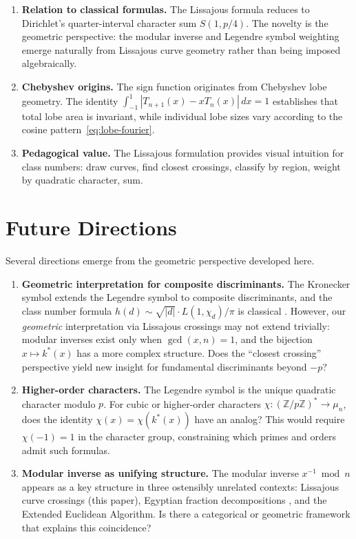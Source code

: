 \documentclass[11pt,a4paper]{article}
\begin{document}
\begin{enumerate}
\item \textbf{Relation to classical formulas.} The Lissajous formula reduces to Dirichlet's quarter-interval character sum $S(1, p/4)$. The novelty is the geometric perspective: the modular inverse and Legendre symbol weighting emerge naturally from Lissajous curve geometry rather than being imposed algebraically.

\item \textbf{Chebyshev origins.} The sign function originates from Chebyshev lobe geometry. The identity $\int_{-1}^{1} |T_{n+1}(x) - x T_n(x)| \, dx = 1$ \cite{Popelka2025integral} establishes that total lobe area is invariant, while individual lobe sizes vary according to the cosine pattern~\eqref{eq:lobe-fourier}.

\item \textbf{Pedagogical value.} The Lissajous formulation provides visual intuition for class numbers: draw curves, find closest crossings, classify by region, weight by quadratic character, sum.
\end{enumerate}

\section{Future Directions}

Several directions emerge from the geometric perspective developed here.

\begin{enumerate}
\item \textbf{Geometric interpretation for composite discriminants.} The Kronecker symbol extends the Legendre symbol to composite discriminants, and the class number formula $h(d) \sim \sqrt{|d|} \cdot L(1, \chi_d) / \pi$ is classical \cite{IrelandRosen}. However, our \emph{geometric} interpretation via Lissajous crossings may not extend trivially: modular inverses exist only when $\gcd(x, n) = 1$, and the bijection $x \mapsto k^*(x)$ has a more complex structure. Does the ``closest crossing'' perspective yield new insight for fundamental discriminants beyond $-p$?

\item \textbf{Higher-order characters.} The Legendre symbol is the unique quadratic character modulo $p$. For cubic or higher-order characters $\chi: (\mathbb{Z}/p\mathbb{Z})^* \to \mu_n$, does the identity $\chi(x) = \chi(k^*(x))$ have an analog? This would require $\chi(-1) = 1$ in the character group, constraining which primes and orders admit such formulas.

\item \textbf{Modular inverse as unifying structure.} The modular inverse $x^{-1} \bmod n$ appears as a key structure in three ostensibly unrelated contexts: Lissajous curve crossings (this paper), Egyptian fraction decompositions \cite{Popelka2025egypt}, and the Extended Euclidean Algorithm. Is there a categorical or geometric framework that explains this coincidence?
\end{enumerate}
\end{document}
